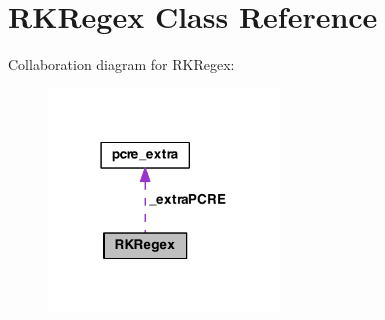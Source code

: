 \hypertarget{interface_r_k_regex}{\section{R\-K\-Regex Class Reference}
\label{interface_r_k_regex}
}


Collaboration diagram for R\-K\-Regex\-:
\nopagebreak
\begin{figure}[H]
\begin{center}
\leavevmode
\includegraphics[width=174pt]{interface_r_k_regex__coll__graph}
\end{center}
\end{figure}
